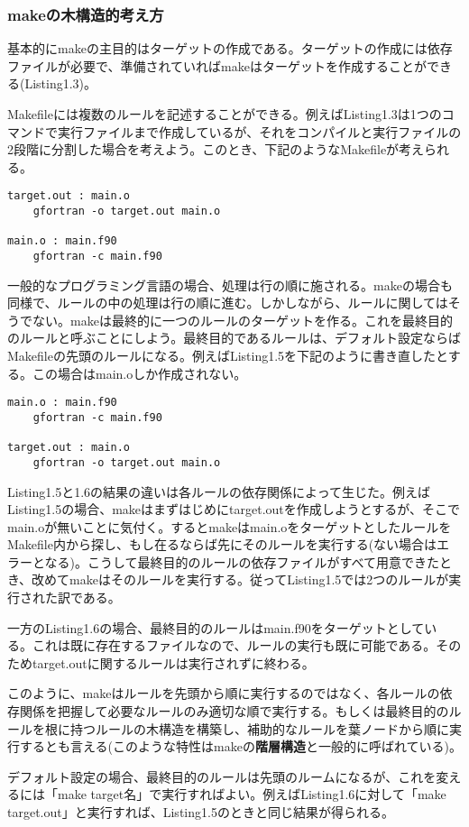\documentclass[dvipdfmx, 9pt, a4paper]{jsarticle}
\numberwithin{equation}{section}
\begin{document}
\subsubsection{makeの木構造的考え方}
基本的にmakeの主目的はターゲットの作成である。ターゲットの作成には依存ファイルが必要で、準備されていればmakeはターゲットを作成することができる(Listing1.3)。\par
Makefileには複数のルールを記述することができる。例えばListing1.3は1つのコマンドで実行ファイルまで作成しているが、それをコンパイルと実行ファイルの2段階に分割した場合を考えよう。このとき、下記のようなMakefileが考えられる。
\begin{lstlisting}[caption=複数のターゲットがあるMakefile]
target.out : main.o
	gfortran -o target.out main.o

main.o : main.f90
	gfortran -c main.f90
\end{lstlisting}\par
一般的なプログラミング言語の場合、処理は行の順に施される。makeの場合も同様で、ルールの中の処理は行の順に進む。しかしながら、ルールに関してはそうでない。makeは最終的に一つのルールのターゲットを作る。これを最終目的のルールと呼ぶことにしよう。最終目的であるルールは、デフォルト設定ならばMakefileの先頭のルールになる。例えばListing1.5を下記のように書き直したとする。この場合はmain.oしか作成されない。
\begin{lstlisting}[caption=複数のターゲットがあるMakefile2]
main.o : main.f90
	gfortran -c main.f90

target.out : main.o
	gfortran -o target.out main.o
\end{lstlisting}\par
Listing1.5と1.6の結果の違いは各ルールの依存関係によって生じた。例えばListing1.5の場合、makeはまずはじめにtarget.outを作成しようとするが、そこでmain.oが無いことに気付く。するとmakeはmain.oをターゲットとしたルールをMakefile内から探し、もし在るならば先にそのルールを実行する(ない場合はエラーとなる)。こうして最終目的のルールの依存ファイルがすべて用意できたとき、改めてmakeはそのルールを実行する。従ってListing1.5では2つのルールが実行された訳である。\par
一方のListing1.6の場合、最終目的のルールはmain.f90をターゲットとしている。これは既に存在するファイルなので、ルールの実行も既に可能である。そのためtarget.outに関するルールは実行されずに終わる。\par
このように、makeはルールを先頭から順に実行するのではなく、各ルールの依存関係を把握して必要なルールのみ適切な順で実行する。もしくは最終目的のルールを根に持つルールの木構造を構築し、補助的なルールを葉ノードから順に実行するとも言える(このような特性はmakeの{\bf 階層構造}と一般的に呼ばれている)。\par
デフォルト設定の場合、最終目的のルールは先頭のルームになるが、これを変えるには「make target名」で実行すればよい。例えばListing1.6に対して「make target.out」と実行すれば、Listing1.5のときと同じ結果が得られる。
\end{document}
